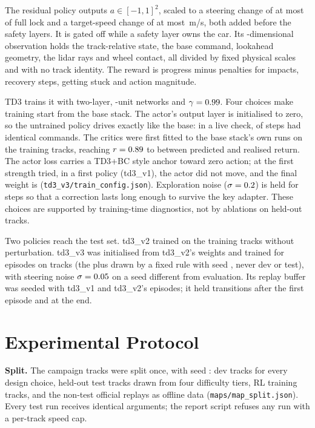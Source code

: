 \documentclass[conference]{IEEEtran}
\begin{document}
The residual policy outputs $a\in[-1,1]^2$, scaled to a steering change of at most \ResSteer of full lock
and a target-speed change of at most \ResSpeed\,m/s, both added before the safety layers. It is gated off
while a safety layer owns the car. Its \ObsSize-dimensional observation holds the track-relative state, the
base command, lookahead geometry, the \NRays lidar rays and wheel contact, all divided by fixed physical
scales and with no track identity. The reward is progress minus penalties for impacts, recovery steps,
getting stuck and action magnitude.

TD3 \cite{fujimoto2018td3} trains it with two-layer, \TDHidden-unit networks and $\gamma=0.99$. Four
choices make training start from the base stack. The actor's output layer is initialised to zero, so the
untrained policy drives exactly like the base: in a live check, \ZeroSame of \ZeroSteps steps had identical
commands. The critics were first fitted to the base stack's own runs on the \CriticMaps training tracks,
reaching $r=0.89$ to \CriticRHi between predicted and realised return. The actor loss carries a TD3+BC
style anchor \cite{fujimoto2021td3bc} toward zero action; at the first strength tried, in a first policy (td3\_v1), the actor did not
move, and the final weight is \AnchorAlpha (\texttt{td3\_v3/train\_config.json}). Exploration noise
($\sigma=0.2$) is held for \NoiseHold steps so that a correction lasts long enough to survive the
key adapter. These choices are supported by training-time diagnostics, not by ablations on held-out tracks.

Two policies reach the test set. td3\_v2 trained on the \NRLTrain training tracks without perturbation.
td3\_v3 was initialised from td3\_v2's weights and trained for \TrainEpisodes episodes on \TrainMaps tracks
(the \NRLTrain plus \TrainExtraMaps drawn by a fixed rule with seed \TrainPoolSeed, never dev or test), with
steering noise $\sigma=0.05$ on a seed different from evaluation. Its replay buffer was seeded with
td3\_v1 and td3\_v2's episodes; it held \BufferStart transitions after the first episode and \BufferEnd at
the end.

\section{Experimental Protocol}
\label{sec:protocol}

\textbf{Split.} The campaign tracks were split once, with seed \SplitSeed: \NDev dev tracks for every design
choice, \NTest held-out test tracks drawn from four difficulty tiers, \NRLTrain RL training tracks, and the
\NOfflineTrain non-test official replays as offline data (\texttt{maps/map\_split.json}). Every test run
receives identical arguments; the report script refuses any run with a per-track speed cap.
\end{document}
